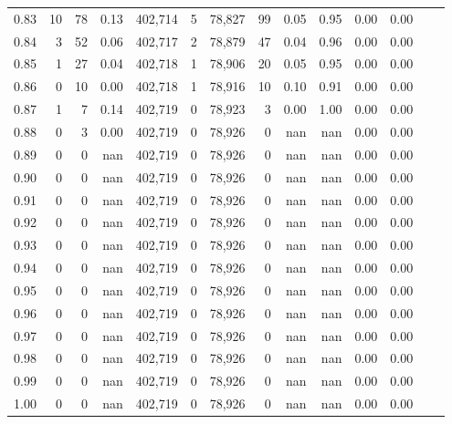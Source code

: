 \begin{tabular}{rrrrrrrrrrrrrr}
0.83 &      10 &     78 &     0.13 &  402,714 &        5 &  78,827 &      99 &  0.05 &  0.95 &  0.00 &      0.00 \\
0.84 &       3 &     52 &     0.06 &  402,717 &        2 &  78,879 &      47 &  0.04 &  0.96 &  0.00 &      0.00 \\
0.85 &       1 &     27 &     0.04 &  402,718 &        1 &  78,906 &      20 &  0.05 &  0.95 &  0.00 &      0.00 \\
0.86 &       0 &     10 &     0.00 &  402,718 &        1 &  78,916 &      10 &  0.10 &  0.91 &  0.00 &      0.00 \\
0.87 &       1 &      7 &     0.14 &  402,719 &        0 &  78,923 &       3 &  0.00 &  1.00 &  0.00 &      0.00 \\
0.88 &       0 &      3 &     0.00 &  402,719 &        0 &  78,926 &       0 &   nan &   nan &  0.00 &      0.00 \\
0.89 &       0 &      0 &      nan &  402,719 &        0 &  78,926 &       0 &   nan &   nan &  0.00 &      0.00 \\
0.90 &       0 &      0 &      nan &  402,719 &        0 &  78,926 &       0 &   nan &   nan &  0.00 &      0.00 \\
0.91 &       0 &      0 &      nan &  402,719 &        0 &  78,926 &       0 &   nan &   nan &  0.00 &      0.00 \\
0.92 &       0 &      0 &      nan &  402,719 &        0 &  78,926 &       0 &   nan &   nan &  0.00 &      0.00 \\
0.93 &       0 &      0 &      nan &  402,719 &        0 &  78,926 &       0 &   nan &   nan &  0.00 &      0.00 \\
0.94 &       0 &      0 &      nan &  402,719 &        0 &  78,926 &       0 &   nan &   nan &  0.00 &      0.00 \\
0.95 &       0 &      0 &      nan &  402,719 &        0 &  78,926 &       0 &   nan &   nan &  0.00 &      0.00 \\
0.96 &       0 &      0 &      nan &  402,719 &        0 &  78,926 &       0 &   nan &   nan &  0.00 &      0.00 \\
0.97 &       0 &      0 &      nan &  402,719 &        0 &  78,926 &       0 &   nan &   nan &  0.00 &      0.00 \\
0.98 &       0 &      0 &      nan &  402,719 &        0 &  78,926 &       0 &   nan &   nan &  0.00 &      0.00 \\
0.99 &       0 &      0 &      nan &  402,719 &        0 &  78,926 &       0 &   nan &   nan &  0.00 &      0.00 \\
1.00 &       0 &      0 &      nan &  402,719 &        0 &  78,926 &       0 &   nan &   nan &  0.00 &      0.00 \\
\bottomrule
\end{tabular}
